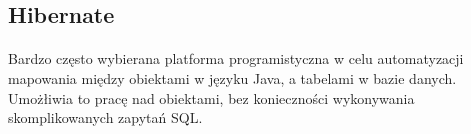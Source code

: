 \subsection{Hibernate}
\paragraph{}
Bardzo często wybierana platforma programistyczna w celu automatyzacji mapowania między obiektami w języku Java, a tabelami w bazie danych. Umożłiwia to pracę nad obiektami, bez konieczności wykonywania skomplikowanych zapytań SQL.




